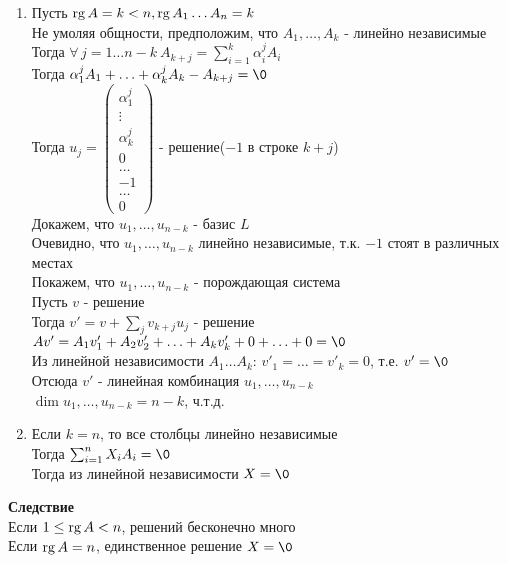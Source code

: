 \documentclass[12pt]{article}
\begin{document}
\begin{enumerate}
    \item Пусть $\operatorname{rg} A = k < n, \operatorname{rg} A_1\ldots A_n =  k$\\
    Не умоляя общности, предположим, что $A_1,\ldots, A_k$ - линейно независимые\\
    Тогда $\forall\,j=1\ldots n-k\ A_{k+j} = \sum_{i=1}^k \alpha_i^j A_i$\\
    Тогда $\alpha_1^j A_1 + \ldots + \alpha_k^j A_k - A_{k+j} = \0$\\
    Тогда $u_j = \begin{pmatrix}
        \alpha_1^j\\
        \vdots\\
        \alpha_k^j\\
        0\\
        \ldots\\
        -1\\
        \ldots\\
        0
    \end{pmatrix}$ - решение($-1$ в строке $k+j$)\\
    Докажем, что $u_1, \ldots, u_{n-k}$ - базис $L$\\
    Очевидно, что $u_1, \ldots, u_{n-k}$ линейно независимые, т.к. $-1$ стоят в различных местах\\
    Покажем, что $u_1, \ldots, u_{n-k}$ - порождающая система\\
    Пусть $v$ - решение\\
    Тогда $v' = v+\sum_{j}v_{k+j}u_j$ - решение\\
    $Av' = A_1v'_1 + A_2v'_2 + \ldots + A_kv'_k + 0 + \ldots + 0 = \0$\\
    Из линейной независимости $A_1 \ldots A_k$: $v'_1 = \ldots = v'_k = 0$, т.е. $v' = \0$\\
    Отсюда $v'$ - линейная комбинация $u_1, \ldots, u_{n-k}$\\
    $\dim u_1, \ldots, u_{n-k} = n - k$, ч.т.д.
    \item Если $k = n$, то все столбцы линейно независимые\\
    Тогда $\sum_{i=1}^n X_iA_i = \0$\\
    Тогда из линейной независимости $X=\0$
\end{enumerate}
\textbf{Следствие}\\
Если $1 \leq \operatorname{rg} A < n$, решений бесконечно много\\
Если $\operatorname{rg} A = n$, единственное решение $X=\0$\\
\end{document}

